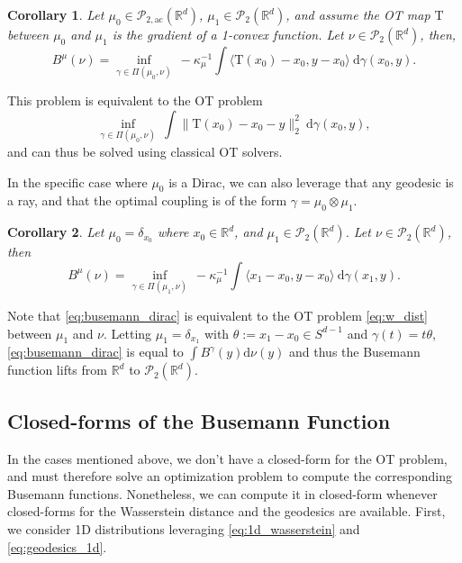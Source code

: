 \documentclass[twoside]{article}
\newtheorem{corollary}{Corollary}
\newcommand{\cP}{\mathcal{P}}
\newcommand{\cPa}{\mathcal{P}_{2,\mathrm{ac}}(\R^d)}
\newcommand{\R}{\mathbb{R}}
\newcommand{\T}{\mathrm{T}}
\begin{document}
\begin{corollary} \label{corollary:busemann_ot_map}
    Let $\mu_0\in\cPa$, $\mu_1\in \cP_2(\R^d)$, and assume the OT map $\T$ between $\mu_0$ and $\mu_1$ is the gradient of a 1-convex function. Let $\nu\in \cP_2(\R^d)$, then, %
    \begin{equation}
        B^\mu(\nu) =  \inf_{\gamma\in\Pi(\mu_0,\nu)}\ -\kappa_\mu^{-1} \int \langle \T(x_0)-x_0, y-x_0\rangle\ \mathrm{d}\gamma(x_0,y).
    \end{equation}
\end{corollary}
This problem is equivalent to the OT problem
\begin{equation}
    \inf_{\gamma\in\Pi(\mu_0,\nu)}\ \int \|\T(x_0)-x_0-y\|_2^2\ \mathrm{d}\gamma(x_0,y),
\end{equation}
and can thus be solved using classical OT solvers.

In the specific case where $\mu_0$ is a Dirac, we can also leverage that any geodesic is a ray, and that the optimal coupling is of the form $\gamma=\mu_0\otimes \mu_1$.

\begin{corollary} \label{corollary:busemann_dirac}
    Let $\mu_0=\delta_{x_0}$ where $x_0\in \R^d$, and $\mu_1\in\cP_2(\R^d)$. Let $\nu\in\cP_2(\R^d)$, then %
    \begin{equation} \label{eq:busemann_dirac}
        B^\mu(\nu) = \inf_{\gamma\in\Pi(\mu_1,\nu)}\ - \kappa_\mu^{-1}\int \langle x_1-x_0, y-x_0\rangle\ \mathrm{d}\gamma(x_1,y).
    \end{equation}
\end{corollary}
Note that \eqref{eq:busemann_dirac} is equivalent to the OT problem \eqref{eq:w_dist} between $\mu_1$ and $\nu$. Letting $\mu_1=\delta_{x_1}$ with $\theta:=x_1-x_0\in S^{d-1}$ and $\gamma(t)=t\theta$, \eqref{eq:busemann_dirac} is equal to $\int B^\gamma(y)\mathrm{d}\nu(y)$ and thus the Busemann function lifts from $\R^d$ to $\cP_2(\R^d)$.




\subsection{Closed-forms of the Busemann Function}\label{sec:closed_form_busemann}


In the cases mentioned above, we don't have a closed-form for the OT problem, and must therefore solve an optimization problem to compute the corresponding Busemann functions. Nonetheless, we can compute it in closed-form whenever closed-forms for the Wasserstein distance and the geodesics are available. First, we consider 1D distributions leveraging \eqref{eq:1d_wasserstein} and \eqref{eq:geodesics_1d}. %
\end{document}
